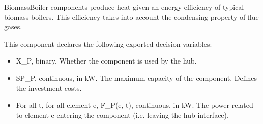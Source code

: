 \documentclass[letterpaper,10pt,english]{sphinxmanual}
\begin{document}
\begin{fulllineitems}
\label{\detokenize{generated/tamos.production.BiomassBoiler:tamos.production.BiomassBoiler}}
\pysigstartsignatures
{}
\pysigstopsignatures{}

\begin{fulllineitems}
\label{\detokenize{generated/tamos.production.BiomassBoiler:tamos.production.BiomassBoiler.__init__}}
\pysigstartsignatures
{}
\pysigstopsignatures
\sphinxAtStartPar
BiomassBoiler components produce heat given an energy efficiency of typical biomass boilers.
This efficiency takes into account the condensing property of flue gases.

\sphinxAtStartPar
This component declares the following exported decision variables:
\begin{itemize}
\item {} 
\sphinxAtStartPar
X\_P, binary.
Whether the component is used by the hub.

\item {} 
\sphinxAtStartPar
SP\_P, continuous, in kW.
The maximum capacity of the component. Defines the investment costs.

\item {} 
\sphinxAtStartPar
For all t, for all element e, F\_P(e, t), continuous, in kW.
The power related to element e entering the component (i.e. leaving the hub interface).


\end{itemize}
\end{fulllineitems}
\end{fulllineitems}
\end{document}
